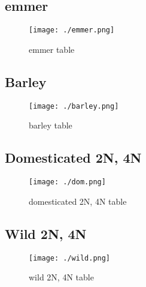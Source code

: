 \documentclass[a4paper]{article}
\begin{document}
\subsection{emmer}
\label{sec:org2630b92}
\begin{figure}[htbp]
\centering
\texttt{[image: ./emmer.png]}
\caption{\label{fig:org810fb56}
emmer table}
\end{figure}

\clearpage


\subsection{Barley}
\label{sec:org5b46b88}
\begin{figure}[htbp]
\centering
\texttt{[image: ./barley.png]}
\caption{\label{fig:orgfeee5a0}
barley table}
\end{figure}


\subsection{Domesticated 2N, 4N}
\label{sec:org93af86d}
\begin{figure}[htbp]
\centering
\texttt{[image: ./dom.png]}
\caption{\label{fig:org0dbb402}
domesticated 2N, 4N table}
\end{figure}

\clearpage
\subsection{Wild 2N, 4N}
\label{sec:org9992cc0}
\begin{figure}[htbp]
\centering
\texttt{[image: ./wild.png]}
\caption{\label{fig:org7255b0d}
wild 2N, 4N  table}
\end{figure}

\clearpage


\end{document}
